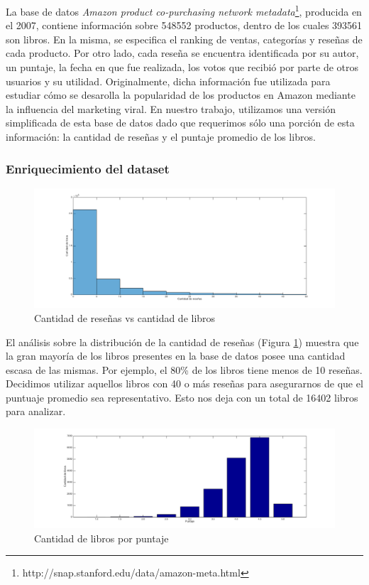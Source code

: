 \documentclass[12pt,journal,compsoc]{IEEEtran}
\begin{document}
La base de datos \textit{Amazon product co-purchasing network metadata}\footnote{http://snap.stanford.edu/data/amazon-meta.html}, producida en el 2007, contiene información sobre 548552 productos, dentro de los cuales 393561 son libros. En la misma, se especifica el ranking de ventas, categorías y reseñas de cada producto. Por otro lado, cada reseña se encuentra identificada por su autor, un puntaje, la fecha en que fue realizada, los votos que recibió por parte de otros usuarios y su utilidad. Originalmente, dicha información fue utilizada para estudiar cómo se desarolla la popularidad de los productos en Amazon mediante la influencia del marketing viral\cite{leskovec}. En nuestro trabajo, utilizamos una versión simplificada de esta base de datos dado que requerimos sólo una porción de esta información: la cantidad de reseñas y el puntaje promedio de los libros.

\subsubsection{Enriquecimiento del dataset}

\begin{figure}[H]
  \includegraphics[width=7.0in]{imgs/cantResenasVsCantLibros.png}
  \caption{Cantidad de reseñas vs cantidad de libros}
  \label{fig:cantReseVsCantLibros}
\end{figure} 

El análisis sobre la distribución de la cantidad de reseñas (Figura \ref{fig:cantReseVsCantLibros}) muestra que la gran mayoría de los libros presentes en la base de datos posee una cantidad escasa de las mismas. Por ejemplo, el 80\% de los libros tiene menos de 10 reseñas. Decidimos utilizar aquellos libros con 40 o más reseñas para asegurarnos de que el puntuaje promedio sea representativo. Esto nos deja con un total de 16402 libros para analizar.

\begin{figure}[H]
  \includegraphics[width=7.0in]{imgs/cantidadDeLibrosVsPuntaje.png}
  \caption{Cantidad de libros por puntaje}
\end{figure} 
\end{document}
